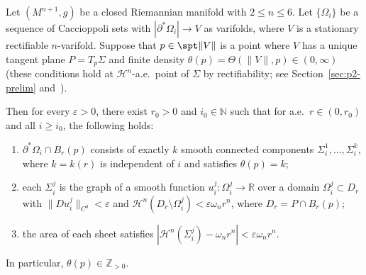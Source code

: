 \begin{lemma}\label{lem:sheet-decomposition}
Let $(M^{n+1}, g)$ be a closed Riemannian manifold with $2 \leq n \leq 6$. Let $\{\Omega_i\}$ be a sequence of Caccioppoli sets with $|\partial^*\Omega_i| \to V$ as varifolds, where $V$ is a stationary rectifiable $n$-varifold. Suppose that $p \in \spt\|V\|$ is a point where $V$ has a unique tangent plane $P = T_p\Sigma$ and finite density $\theta(p) = \Theta(\|V\|, p) \in (0, \infty)$ (these conditions hold at $\mathcal{H}^n$-a.e.\ point of $\Sigma$ by rectifiability; see Section~\ref{sec:p2-prelim} and~\cite[Section~11]{Sim84}).

Then for every $\varepsilon > 0$, there exist $r_0 > 0$ and $i_0 \in \mathbb{N}$ such that for a.e.\ $r \in (0, r_0)$ and all $i \geq i_0$, the following holds:
\begin{enumerate}[label=\textup{(\roman*)}]
    \item $\partial^*\Omega_i \cap B_r(p)$ consists of exactly $k$ smooth connected components $\Sigma_i^1, \ldots, \Sigma_i^k$, where $k = k(r)$ is independent of $i$ and satisfies $\theta(p) = k$;
    \item each $\Sigma_i^j$ is the graph of a smooth function $u_i^j \colon \Omega_i^j \to \mathbb{R}$ over a domain $\Omega_i^j \subset D_r$ with $\|Du_i^j\|_{C^0} < \varepsilon$ and $\mathcal{H}^n(D_r \setminus \Omega_i^j) < \varepsilon \omega_n r^n$, where $D_r = P \cap B_r(p)$;
    \item the area of each sheet satisfies $|\mathcal{H}^n(\Sigma_i^j) - \omega_n r^n| < \varepsilon \omega_n r^n$.
\end{enumerate}
In particular, $\theta(p) \in \mathbb{Z}_{>0}$.
\end{lemma}

